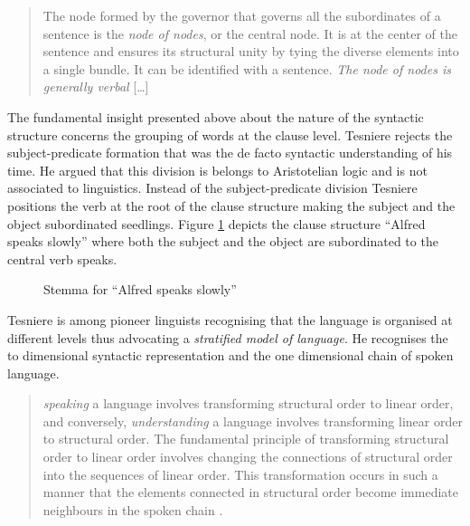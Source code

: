 \begin{quotation}
    The node formed by the governor that governs all the subordinates of a sentence is the \textit{node of nodes}, or the central node. It is at the center of the sentence and ensures its structural unity by tying the diverse elements into a single bundle. It can be identified with a sentence. \textit{The node of nodes is generally verbal} [\dots] \citep[7]{Tesniere2015}
\end{quotation}

The fundamental insight presented above about the nature of the syntactic structure concerns the grouping of words at the clause level. Tesniere rejects the subject-predicate formation that was the de facto syntactic understanding of his time. He argued that this division is belongs to Aristotelian logic and is not associated to linguistics. Instead of the subject-predicate division Tesniere positions the verb at the root of the clause structure making the subject and the object subordinated seedlings. Figure \ref{fig:stemma2} depicts the clause structure ``Alfred speaks slowly'' where both the subject and the object are subordinated to the central verb speaks. 

\begin{figure}[!ht]
    \centering
    \label{fig:stemma2}
    \caption{Stemma for ``Alfred speaks slowly''}
\end{figure}

Tesniere is among pioneer linguists recognising that the language is organised at different levels thus advocating a \textit{stratified model of language}. He recognises the to dimensional syntactic representation and the one dimensional chain of spoken language. 

\begin{quotation}
    \textit{speaking} a language involves transforming structural order to linear order, and conversely, \textit{understanding} a language involves transforming linear order to structural order. The fundamental principle of transforming structural order to linear order involves changing the connections of structural order into the sequences of linear order. This transformation occurs in such a manner that the elements connected in structural order become immediate neighbours in the spoken chain \citep[12]{Tesniere2015}.
\end{quotation}

